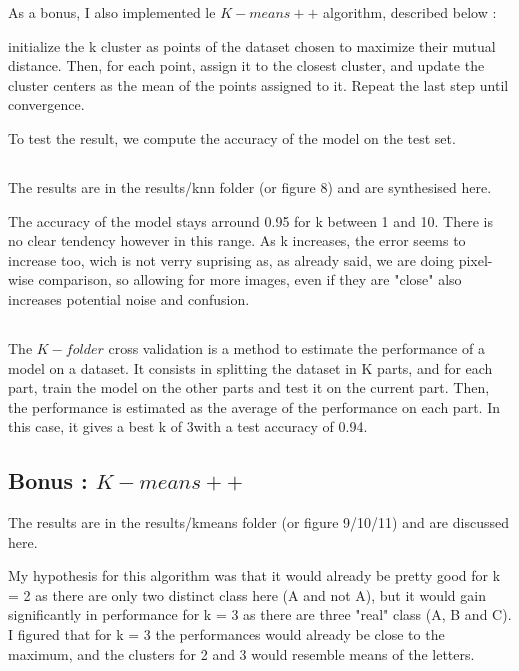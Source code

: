 \documentclass{article}
\begin{document}
As a bonus, I also implemented le $K-means++$ algorithm, described below :

initialize the k cluster as points of the dataset chosen to maximize their mutual distance.
Then, for each point, assign it to the closest cluster, and update the cluster centers as the mean of the points assigned to it.
Repeat the last step until convergence.

To test the result, we compute the accuracy of the model on the test set.

\subsection{}

The results are in the results/knn folder (or figure 8) and are synthesised here.

The accuracy of the model stays arround 0.95 for k between 1 and 10. There is no clear tendency however in this range. As k increases, the error seems to increase too, wich is not verry suprising as, as already said, we are doing pixel-wise comparison, so allowing for more images, even if they are "close" also increases potential noise and confusion.

\subsection{}

The $K-folder$ cross validation is a method to estimate the performance of a model on a dataset. It consists in splitting the dataset in K parts, and for each part, train the model on the other parts and test it on the current part. Then, the performance is estimated as the average of the performance on each part.
In this case, it gives a best k of 3with a test accuracy of 0.94.

\subsection{Bonus : $K-means++$}

The results are in the results/kmeans folder (or figure 9/10/11) and are discussed here.\newline

My hypothesis for this algorithm was that it would already be pretty good for k = 2 as there are only two distinct class here (A and not A), but it would gain significantly in performance for k = 3 as there are three "real" class (A, B and C).
I figured that for k = 3 the performances would already be close to the maximum, and the clusters for 2 and 3 would resemble means of the letters.\newline
\end{document}
